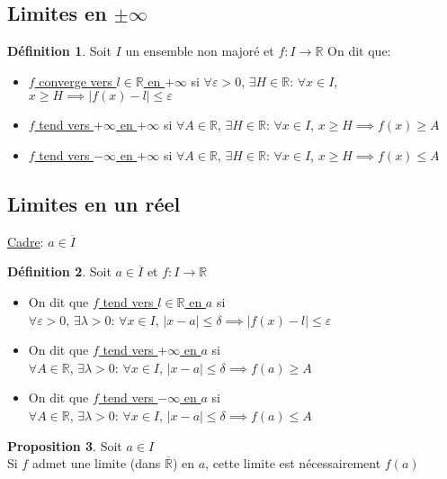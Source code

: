 \documentclass[10pt,a4paper]{article}
\theoremstyle{definition}
\newtheorem{proposition}{Proposition}[section]
\newtheorem{definition}[proposition]{Définition}
\begin{document}
\subsection{Limites en $\pm\infty$}
\begin{definition}
Soit $I$ un ensemble non majoré et $f: I \to \mathbb{R}$
On dit que:
\begin{itemize}
\item \uline{$f$ converge vers $l \in \mathbb{R}$ en $+\infty$} si $\forall \varepsilon > 0$, $\exists H \in \mathbb{R}$: $\forall x \in I$, $x \geq H \implies |f(x) - l| \leq \varepsilon$
\item \uline{$f$ tend vers $+\infty$ en $+\infty$} si $\forall A \in \mathbb{R}$, $\exists H \in \mathbb{R}$: $\forall x \in I$, $x \geq H \implies f(x) \geq A$
\item \uline{$f$ tend vers $-\infty$ en $+\infty$} si $\forall A \in \mathbb{R}$, $\exists H \in \mathbb{R}$: $\forall x \in I$, $x \geq H \implies f(x) \leq A$
\end{itemize}
\end{definition}

\subsection{Limites en un réel}
\uline{Cadre}: $a \in \overline{I}$
\begin{definition}
Soit $a \in \overline{I}$ et $f: I \to \mathbb{R}$
\begin{itemize}
\item On dit que \uline{$f$ tend vers $l \in \mathbb{R}$ en $a$} si \\
$\forall \varepsilon > 0$, $\exists \lambda > 0$: $\forall x \in I$, $|x - a| \leq \delta \implies |f(x) - l| \leq \varepsilon$
\item On dit que \uline{$f$ tend vers $+\infty$ en $a$} si \\
$\forall A \in \mathbb{R}$, $\exists \lambda > 0$: $\forall x \in I$, $|x - a| \leq \delta \implies f(a) \geq A$
\item On dit que \uline{$f$ tend vers $-\infty$ en $a$} si \\
$\forall A \in \mathbb{R}$, $\exists \lambda > 0$: $\forall x \in I$, $|x - a| \leq \delta \implies f(a) \leq A$
\end{itemize}
\end{definition}
\begin{proposition}
Soit $a \in I$ \\
Si $f$ admet une limite (dans $\overline{\mathbb{R}}$) en $a$, cette limite est nécessairement $f(a)$
\end{proposition}
\end{document}

